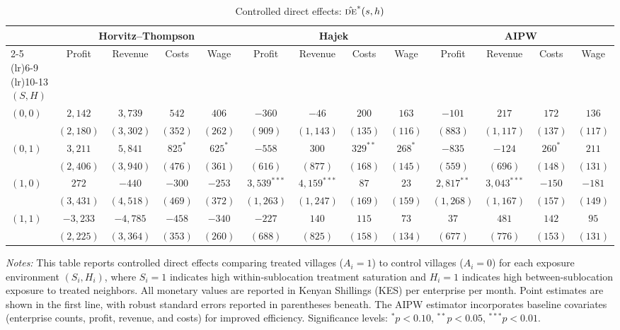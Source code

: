 \documentclass{article}
\newcommand{\de}{\textsc{de}}
\begin{document}
\begin{table}[H]
\centering
\caption{Controlled direct effects: $\hat{\de}^{*}(s,h)$}
\label{tab:controlled_effects}
\footnotesize
\begin{tabular}{lcccccccccccc}
\toprule
& \multicolumn{4}{c}{Horvitz--Thompson} & \multicolumn{4}{c}{Hajek} & \multicolumn{4}{c}{AIPW} \\
\cmidrule(lr){2-5} \cmidrule(lr){6-9} \cmidrule(lr){10-13}
$(S,H)$ & Profit & Revenue & Costs & Wage & Profit & Revenue & Costs & Wage & Profit & Revenue & Costs & Wage \\
\midrule
$(0,0)$ & $2{,}142$ & $3{,}739$ & $542$ & $406$ & $-360$ & $-46$ & $200$ & $163$ & $-101$ & $217$ & $172$ & $136$ \\
        & $(2{,}180)$ & $(3{,}302)$ & $(352)$ & $(262)$ & $(909)$ & $(1{,}143)$ & $(135)$ & $(116)$ & $(883)$ & $(1{,}117)$ & $(137)$ & $(117)$ \\
\addlinespace
$(0,1)$ & $3{,}211$ & $5{,}841$ & $825^{*}$ & $625^{*}$ & $-558$ & $300$ & $329^{**}$ & $268^{*}$ & $-835$ & $-124$ & $260^{*}$ & $211$ \\
        & $(2{,}406)$ & $(3{,}940)$ & $(476)$ & $(361)$ & $(616)$ & $(877)$ & $(168)$ & $(145)$ & $(559)$ & $(696)$ & $(148)$ & $(131)$ \\
\addlinespace
$(1,0)$ & $272$ & $-440$ & $-300$ & $-253$ & $3{,}539^{***}$ & $4{,}159^{***}$ & $87$ & $23$ & $2{,}817^{**}$ & $3{,}043^{***}$ & $-150$ & $-181$ \\
        & $(3{,}431)$ & $(4{,}518)$ & $(469)$ & $(372)$ & $(1{,}263)$ & $(1{,}247)$ & $(169)$ & $(159)$ & $(1{,}268)$ & $(1{,}167)$ & $(157)$ & $(149)$ \\
\addlinespace
$(1,1)$ & $-3{,}233$ & $-4{,}785$ & $-458$ & $-340$ & $-227$ & $140$ & $115$ & $73$ & $37$ & $481$ & $142$ & $95$ \\
        & $(2{,}225)$ & $(3{,}364)$ & $(353)$ & $(260)$ & $(688)$ & $(825)$ & $(158)$ & $(134)$ & $(677)$ & $(776)$ & $(153)$ & $(131)$ \\
\bottomrule
\end{tabular}
\begin{minipage}{0.95\textwidth}
\vspace{2mm}
\footnotesize
\textit{Notes:} This table reports controlled direct effects comparing treated villages ($A_i=1$) to control villages ($A_i=0$) for each exposure environment $(S_i, H_i)$, where $S_i=1$ indicates high within-sublocation treatment saturation and $H_i=1$ indicates high between-sublocation exposure to treated neighbors. All monetary values are reported in Kenyan Shillings (KES) per enterprise per month. Point estimates are shown in the first line, with robust standard errors reported in parentheses beneath. The AIPW estimator incorporates baseline covariates (enterprise counts, profit, revenue, and costs) for improved efficiency. Significance levels: $^{*}p<0.10$, $^{**}p<0.05$, $^{***}p<0.01$.

\end{minipage}
\end{table}
\end{document}
